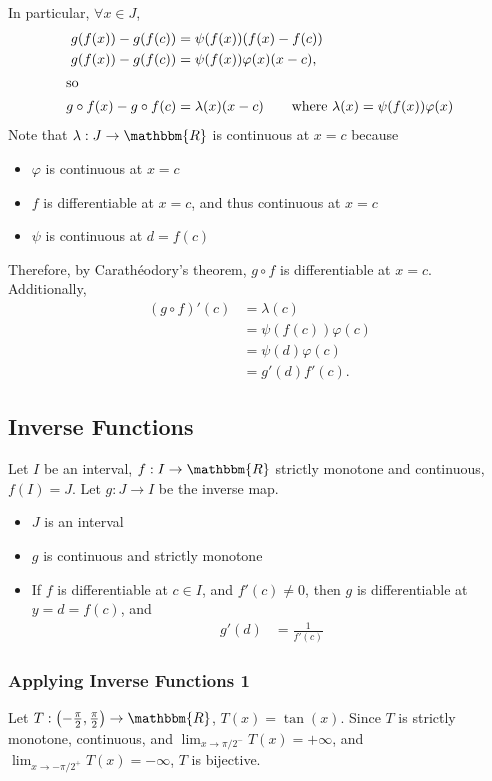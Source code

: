 \documentclass[10pt]{extarticle}
\newcommand{\R}{\mathbbm{R}}
\begin{document}
    In particular, $\forall x\in J$,
    \begin{align*}
      g(f(x)) - g(f(c)) &= \psi(f(x))(f(x) - f(c))\\
      g(f(x)) - g(f(c)) &= \psi(f(x))\varphi(x)(x-c),\\
      \shortintertext{so}
      g\circ f(x) - g\circ f(c) &= \lambda(x)(x-c) \tag*{where $\lambda(x) = \psi(f(x))\varphi(x)$}
    \end{align*}
    Note that $\lambda: J\rightarrow \R$ is continuous at $x=c$ because
    \begin{itemize}
      \item $\varphi$ is continuous at $x=c$
      \item $f$ is differentiable at $x=c$, and thus continuous at $x=c$
      \item $\psi$ is continuous at $d = f(c)$
    \end{itemize}
    Therefore, by Carathéodory's theorem, $g\circ f$ is differentiable at $x=c$.\\

    Additionally,
    \begin{align*}
      \left(g\circ f\right)'(c) &= \lambda(c)\\
                                &= \psi(f(c))\varphi(c)\\
                                &= \psi(d)\varphi(c)\\
                                &= g'(d)f'(c).
    \end{align*}
  \subsection{Inverse Functions}%
    Let $I$ be an interval, $f: I\rightarrow \R$ strictly monotone and continuous, $f(I) = J$. Let $g: J\rightarrow I$ be the inverse map.
    \begin{itemize}
      \item $J$ is an interval
      \item $g$ is continuous and strictly monotone
      \item If $f$ is differentiable at $c\in I$, and $f'(c) \neq 0$, then $g$ is differentiable at $y = d = f(c)$, and
        \begin{align*}
          g'(d) &= \frac{1}{f'(c)}
        \end{align*}
    \end{itemize}
    \subsubsection{Applying Inverse Functions 1}%
    Let $T: \left(-\frac{\pi}{2},\frac{\pi}{2}\right)\rightarrow \R$, $T(x) = \tan(x)$. Since $T$ is strictly monotone, continuous, and $\lim_{x\rightarrow \pi/2^{-}}T(x) = +\infty$, and $\lim_{x\rightarrow -\pi/2^{+}}T(x) = -\infty$, $T$ is bijective.\\
\end{document}
